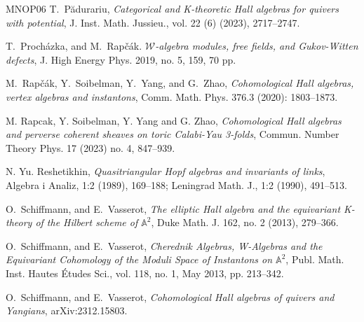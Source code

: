 \documentclass[10pt]{amsart}
\theoremstyle{definition}
\numberwithin{equation}{section}
\begin{document}
\begin{thebibliography}{MNOP06}
T.~P\u{a}durariu, \textit{Categorical and K-theoretic Hall algebras for quivers with potential}, J. Inst. Math. Jussieu., vol. 22 (6)  (2023), 2717--2747.




 T.~Proch{\'a}zka, and M.~Rap{\v{c}}{\'a}k. \textit{$\mathcal {W} $-algebra modules, free fields, and Gukov-Witten defects}, 
J. High Energy Phys. 2019, no. 5, 159, 70 pp.




 M.~Rap{\v{c}}{\'a}k, Y.~Soibelman, Y.~Yang, and G.~Zhao, \textit{Cohomological Hall algebras, vertex algebras and instantons}, Comm. Math. Phys. 376.3 (2020): 1803--1873.

M. Rapcak, Y. Soibelman, Y. Yang and G. Zhao, \textit{Cohomological Hall algebras and perverse coherent sheaves on toric Calabi-Yau 3-folds}, Commun. Number Theory Phys. 17 (2023) no. 4, 847--939.

 N. Yu. Reshetikhin, \textit{Quasitriangular Hopf algebras and invariants of links}, Algebra i Analiz, 1:2 (1989), 169–188; Leningrad Math. J., 1:2 (1990), 491–513.



 O.~Schiffmann, and E.~Vasserot, \textit{The elliptic Hall algebra and the equivariant K-theory of the Hilbert scheme of $\mathbb A^2$}, 
Duke Math. J. 162, no. 2 (2013), 279--366.

 O.~Schiffmann, and E.~Vasserot, \textit{Cherednik Algebras, W-Algebras and the Equivariant Cohomology of the Moduli Space of Instantons on $\mathbb A^2$}, Publ. Math. Inst. Hautes Études Sci., vol. 118, no. 1, May 2013, pp. 213–342.

 O.~Schiffmann, and E.~Vasserot, \textit{Cohomological Hall algebras of quivers and Yangians}, arXiv:2312.15803.



\end{thebibliography}
\end{document}
